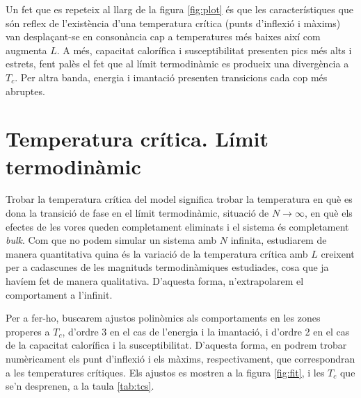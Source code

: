 \documentclass[a4paper]{article}
\begin{document}
Un fet que es repeteix al llarg de la figura \ref{fig:plot} és que les característiques que són reflex de l'existència d'una temperatura crítica (punts d'inflexió i màxims) van desplaçant-se en consonància cap a temperatures més baixes així com augmenta $L$. A més, capacitat calorífica i susceptibilitat presenten pics més alts i estrets, fent palès el fet que al límit termodinàmic es produeix una divergència a $T_c$. Per altra banda, energia i imantació presenten transicions cada cop més abruptes.

\section{Temperatura crítica. Límit termodinàmic}

Trobar la temperatura crítica del model significa trobar la temperatura en què es dona la transició de fase en el límit termodinàmic, situació de $N \to \infty$, en què els efectes de les vores queden completament eliminats i el sistema és completament \textit{bulk}. Com que no podem simular un sistema amb $N$ infinita, estudiarem de manera quantitativa quina és la variació de la temperatura crítica amb $L$ creixent per a cadascunes de les magnituds termodinàmiques estudiades, cosa que ja havíem fet de manera qualitativa. D'aquesta forma, n'extrapolarem el comportament a l'infinit.

Per a fer-ho, buscarem ajustos polinòmics als comportaments en les zones properes a $T_c$, d'ordre 3 en el cas de l'energia i la imantació, i d'ordre 2 en el cas de la capacitat calorífica i la susceptibilitat. D'aquesta forma, en podrem trobar numèricament els punt d'inflexió i els màxims, respectivament, que correspondran a les temperatures crítiques. Els ajustos es mostren a la figura \ref{fig:fit}, i les $T_c$ que se'n desprenen, a la taula \ref{tab:tcs}.
\end{document}
